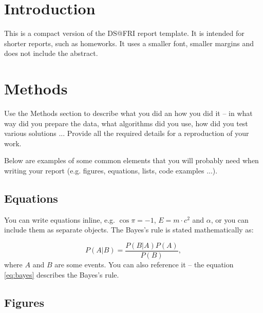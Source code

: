 \documentclass[fleqn,oneauthor,9pt]{ds_report}
\begin{document}
\flushbottom 

\maketitle



\section*{Introduction}
This is a compact version of the DS@FRI report template. It is intended for shorter reports, such as homeworks. It uses a smaller font, smaller margins and does not include the abstract.



\section*{Methods}

Use the Methods section to describe what you did an how you did it -- in what way did you prepare the data, what algorithms did you use, how did you test various solutions ... Provide all the required details for a reproduction of your work.

Below are examples of some common elements that you will probably need when writing your report (e.g. figures, equations, lists, code examples ...).


\subsection*{Equations}

You can write equations inline, e.g. $\cos\pi=-1$, $E = m \cdot c^2$ and $\alpha$, or you can include them as separate objects. The Bayes’s rule is stated mathematically as:

\begin{equation}
  P(A|B) = \frac{P(B|A)P(A)}{P(B)},
  \label{eq:bayes}
\end{equation}
where $A$ and $B$ are some events. You can also reference it -- the equation \ref{eq:bayes} describes the Bayes's rule.

\subsection*{Figures}
\end{document}

